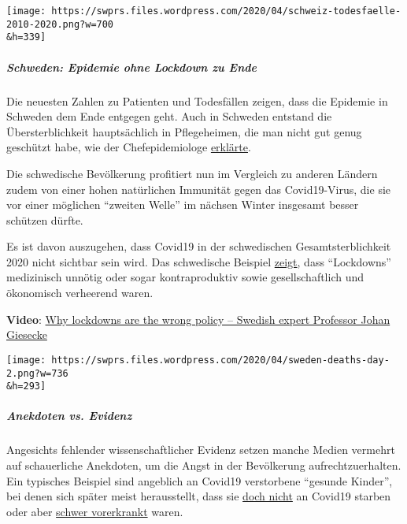 \texttt{[image: https://swprs.files.wordpress.com/2020/04/schweiz-todesfaelle-2010-2020.png?w=700\\\&h=339]}

\hypertarget{schweden-epidemie-ohne-lockdown-zu-ende}{%
\subparagraph{\texorpdfstring{\textbf{Schweden: Epidemie ohne Lockdown
zu
Ende}}{Schweden: Epidemie ohne Lockdown zu Ende}}\label{schweden-epidemie-ohne-lockdown-zu-ende}}

Die neuesten Zahlen zu Patienten und Todesfällen zeigen, dass die
Epidemie in Schweden dem Ende entgegen geht. Auch in Schweden entstand
die Übersterblichkeit hauptsächlich in Pflegeheimen, die man nicht gut
genug geschützt habe, wie der Chefepidemiologe
\href{https://www.washingtontimes.com/news/2020/apr/15/sweden-coronavirus-rates-easing-despite-loose-rule/}{erklärte}.

Die schwedische Bevölkerung profitiert nun im Vergleich zu anderen
Ländern zudem von einer hohen natürlichen Immunität gegen das
Covid19-Virus, die sie vor einer möglichen ``zweiten Welle'' im nächsen
Winter insgesamt besser schützen dürfte.

Es ist davon auszugehen, dass Covid19 in der schwedischen
Gesamtsterblichkeit 2020 nicht sichtbar sein wird. Das schwedische
Beispiel
\href{https://www.kleinezeitung.at/international/corona/5802224/Anzeichen-fuer-Entspannung_Schweden-sieht-sich-auf-dem-richtigen-Weg}{zeigt},
dass ``Lockdowns'' medizinisch unnötig oder sogar kontraproduktiv sowie
gesellschaftlich und ökonomisch verheerend waren.

\textbf{Video}: \href{https://www.youtube.com/watch?v=bfN2JWifLCY}{Why
lockdowns are the wrong policy -- Swedish expert Professor Johan
Giesecke}

\texttt{[image: https://swprs.files.wordpress.com/2020/04/sweden-deaths-day-2.png?w=736\\\&h=293]}

\hypertarget{anekdoten-vs-evidenz}{%
\subparagraph{\texorpdfstring{\textbf{Anekdoten vs.
Evidenz}}{Anekdoten vs. Evidenz}}\label{anekdoten-vs-evidenz}}

Angesichts fehlender wissenschaftlicher Evidenz setzen manche Medien
vermehrt auf schauerliche Anekdoten, um die Angst in der Bevölkerung
aufrechtzuerhalten. Ein typisches Beispiel sind angeblich an Covid19
verstorbene ``gesunde Kinder'', bei denen sich später meist
herausstellt, dass sie
\href{https://www.dailymail.co.uk/news/article-8193487/Coroner-refuses-rule-COVID-19-cause-death-six-week-old-Connecticut-baby.html}{doch
nicht} an Covid19 starben oder aber
\href{https://www.msn.com/de-ch/news/other/spanischer-nachwuchs-trainer-stirbt-an-corona/ar-BB11gT64}{schwer
vorerkrankt} waren.

